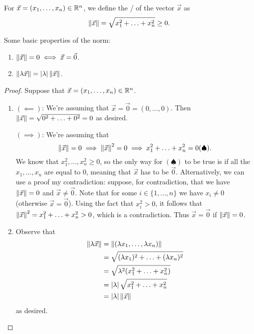 \documentclass[main.tex]{subfiles}
\begin{document}
\begin{definition}[Norm]
    For $\vec{x} = (x_1, \ldots , x_n)\in \mathbb R^n$, we define the / of the vector $\vec{x}$ as
    \[\left\lVert \vec{x} \right\rVert = \sqrt{x_1^2 + \ldots + x_n^2} \ge 0.\]
\end{definition}

Some basic properties of the norm:
\begin{enumerate}
    \item $\left\lVert \vec{x} \right\rVert = 0 \iff \vec{x} = \vec{0}$.
    \item $\left\lVert \lambda\vec{x} \right\rVert = \left\lvert \lambda \right\rvert\left\lVert \vec{x} \right\rVert$.
\end{enumerate}

\begin{proof}
    Suppose that $\vec{x} = (x_1, \ldots , x_n)\in \mathbb R^n$.
    \begin{enumerate}
        \item $(\impliedby)$: We're assuming that $\vec{x} = \vec{0} = (0, \ldots , 0)$. Then $\left\lVert \vec{x} \right\rVert = \sqrt{0^2 + \ldots + 0^2} = 0$ as desired.

        $(\implies)$: We're assuming that
        \[\left\lVert \vec{x} \right\rVert = 0 \implies \left\lVert \vec{x} \right\rVert^2 = 0\implies x_1^2 + \ldots + x_n^2 = 0 (\spadesuit).\]
        We know that $x_1^2, \ldots , x_n^2 \ge 0$, so the only way for $(\spadesuit)$ to be true is if all the $x_1, \ldots , x_n$ are equal to $0$, meaning that $\vec{x}$ has to be $\vec{0}$. Alternatively, we can use a proof my contradiction: suppose, for contradiction, that we have $\left\lVert \vec{x} \right\rVert = 0$ and $\vec{x}\neq \vec{0}$. Note that for some $i\in \{1, \ldots , n\}$ we have $x_i\neq 0$ (otherwise $\vec{x} = \vec{0}$). Using the fact that $x_i^2 > 0$, it follows that $\left\lVert \vec{x} \right\rVert^2 = x_1^2 + \ldots + x_n^2 > 0$, which is a contradiction. Thus $\vec{x} = \vec{0}$ if $\left\lVert \vec{x} \right\rVert = 0$.
        \item Observe that
        \begin{align*}
            \left\lVert \lambda \vec{x} \right\rVert &= \left\lVert (\lambda x_1, \ldots , \lambda x_n) \right\rVert \\
            &= \sqrt{(\lambda x_1)^2 + \ldots + (\lambda x_n)^2} \\
            &= \sqrt{\lambda^2(x_1^2 + \ldots + x_n^2)} \\
            &= \left\lvert \lambda \right\rvert\sqrt{x_1^2 + \ldots + x_n^2} \\
            &= \left\lvert \lambda \right\rvert\left\lVert \vec{x} \right\rVert
        \end{align*}
        as desired.\qedhere
    \end{enumerate}
\end{proof}
\end{document}
